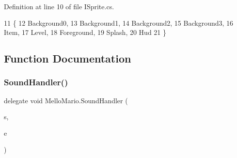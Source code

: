 Definition at line 10 of file I\+Sprite.\+cs.


\begin{DoxyCode}
11     \{
12         Background0,
13         Background1,
14         Background2,
15         Background3,
16         Item,
17         Level,
18         Foreground,
19         Splash,
20         Hud
21     \}
\end{DoxyCode}


\subsection{Function Documentation}
\mbox{\label{namespaceMelloMario_a5a6c579677e57097bf062dc919b0454e}} 
\subsubsection{Sound\+Handler()}
{\footnotesize\ttfamily delegate void Mello\+Mario.\+Sound\+Handler (\begin{DoxyParamCaption}\item[{\textbf{ I\+Soundable}}]{s,  }\item[{\textbf{ I\+Sound\+Args}}]{e }\end{DoxyParamCaption})\hspace{0.3cm}{\ttfamily [package]}}


